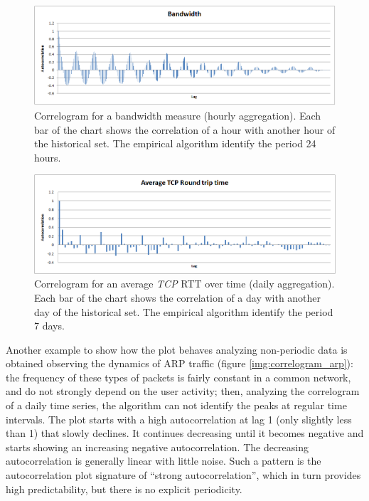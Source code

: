 \documentclass[12pt,a4paper,cucitura]{toptesi}
\begin{document}
\begin{figure}
\centering
\includegraphics[width=\linewidth]{correlogram_bw2_2.png}
\caption[Correlogram for a bandwidth measure (hourly aggregation)]{Correlogram for a bandwidth measure (hourly aggregation). Each bar of the chart shows the correlation of a hour with another hour of the historical set. The empirical algorithm identify the period 24 hours.}
\label{img:correlogram_bw2}
\end{figure}

\begin{figure}
\centering
\includegraphics[width=\linewidth]{correlogram_rtt_2.png}
\caption[Correlogram for an average \emph{TCP} RTT over time (daily aggregation)]{Correlogram for an average \emph{TCP} RTT over time (daily aggregation). Each bar of the chart shows the correlation of a day with another day of the historical set. The empirical algorithm identify the period 7 days.}
\label{img:correlogram_rtt}
\end{figure}

Another example to show how the plot behaves analyzing non-periodic data is obtained observing the dynamics of ARP traffic (figure \ref{img:correlogram_arp}): the frequency of these types of packets is fairly constant in a common network, and do not strongly depend on the user activity; then, analyzing the correlogram of a daily time series, the algorithm can not identify the peaks at regular time intervals.
The plot starts with a high autocorrelation at lag 1 (only slightly less than 1) that slowly declines. It continues decreasing until it becomes negative and starts showing an increasing negative autocorrelation. The decreasing autocorrelation is generally linear with little noise. Such a pattern is the autocorrelation plot signature of ``strong autocorrelation'', which in turn provides high predictability, but there is no explicit periodicity.
\end{document}
